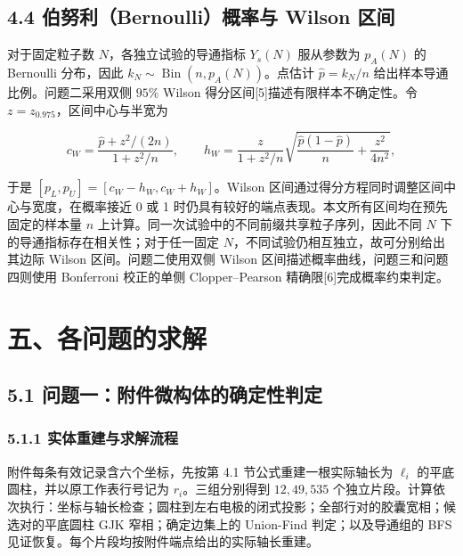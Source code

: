 \subsection{4.4 伯努利（Bernoulli）概率与 Wilson 区间}\label{ux4f2fux52aaux5229ux6982ux7387ux4e0e-wilson-ux533aux95f4}

对于固定粒子数 \(N\)，各独立试验的导通指标 \(Y_s(N)\) 服从参数为 \(p_A(N)\) 的 Bernoulli 分布，因此 \(k_N\sim\operatorname{Bin}(n,p_A(N))\)。点估计 \(\widehat p=k_N/n\) 给出样本导通比例。问题二采用双侧 \(95\%\) Wilson 得分区间{[}5{]}描述有限样本不确定性。令 \(z=z_{0.975}\)，区间中心与半宽为

\[
c_W=\frac{\widehat p+z^2/(2n)}{1+z^2/n},\qquad
h_W=\frac{z}{1+z^2/n}
\sqrt{\frac{\widehat p(1-\widehat p)}{n}+\frac{z^2}{4n^2}},
\]

于是 \([p_L,p_U]=[c_W-h_W,c_W+h_W]\)。Wilson 区间通过得分方程同时调整区间中心与宽度，在概率接近 0 或 1 时仍具有较好的端点表现。本文所有区间均在预先固定的样本量 \(n\) 上计算。同一次试验中的不同前缀共享粒子序列，因此不同 \(N\) 下的导通指标存在相关性；对于任一固定 \(N\)，不同试验仍相互独立，故可分别给出其边际 Wilson 区间。问题二使用双侧 Wilson 区间描述概率曲线，问题三和问题四则使用 Bonferroni 校正的单侧 Clopper--Pearson 精确限{[}6{]}完成概率约束判定。

\section{五、各问题的求解}\label{ux4e94ux5404ux95eeux9898ux7684ux6c42ux89e3}

\subsection{5.1 问题一：附件微构体的确定性判定}\label{ux95eeux9898ux4e00ux9644ux4ef6ux5faeux6784ux4f53ux7684ux786eux5b9aux6027ux5224ux5b9a}

\subsubsection{5.1.1 实体重建与求解流程}\label{ux5b9eux4f53ux91cdux5efaux4e0eux6c42ux89e3ux6d41ux7a0b}

附件每条有效记录含六个坐标，先按第 4.1 节公式重建一根实际轴长为 \(\ell_i\) 的平底圆柱，并以原工作表行号记为 \(r_i\)。三组分别得到 \(12,49,535\) 个独立片段。计算依次执行：坐标与轴长检查；圆柱到左右电极的闭式投影；全部行对的胶囊宽相；候选对的平底圆柱 GJK 窄相；确定边集上的 Union-Find 判定；以及导通组的 BFS 见证恢复。每个片段均按附件端点给出的实际轴长重建。


